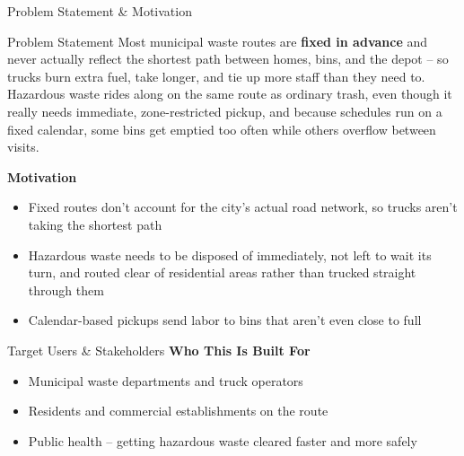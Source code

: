 \documentclass[aspectratio=169,11pt]{beamer}
\begin{document}
\begin{frame}{Problem Statement \& Motivation}
\small
\begin{block}{Problem Statement}
Most municipal waste routes are \textbf{fixed in advance} and never actually reflect the shortest path between homes, bins, and the depot -- so trucks burn extra fuel, take longer, and tie up more staff than they need to. Hazardous waste rides along on the same route as ordinary trash, even though it really needs immediate, zone-restricted pickup, and because schedules run on a fixed calendar, some bins get emptied too often while others overflow between visits.
\end{block}
\vspace{0.7mm}
\textbf{\color{GEUBlue}Motivation}
\begin{itemize}\itemsep2pt
\item Fixed routes don't account for the city's actual road network, so trucks aren't taking the shortest path
\item Hazardous waste needs to be disposed of immediately, not left to wait its turn, and routed clear of residential areas rather than trucked straight through them
\item Calendar-based pickups send labor to bins that aren't even close to full
\end{itemize}
\end{frame}

\begin{frame}{Target Users \& Stakeholders}
\textbf{\color{GEUBlue}Who This Is Built For}
\vspace{2mm}
\begin{itemize}\itemsep6pt
\item Municipal waste departments and truck operators
\item Residents and commercial establishments on the route
\item Public health -- getting hazardous waste cleared faster and more safely
\end{itemize}
\end{frame}
\end{document}
